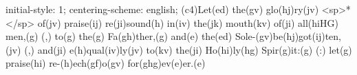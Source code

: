 initial-style: 1;
centering-scheme: english;
(c4)Let(ed) the(gv) glo(hj)ry(jv) <sp>*</sp> of(jv) praise(ij) re(ji)sound(h) in(iv) the(jk) mouth(kv) of(ji) all(hiHG) men,(g) (,) to(g) the(g) Fa(gh)ther,(g) and(e) the(ed) Sole-(gv)be(hj)got(ij)ten,(jv) (,) and(ji) e(h)qual(iv)ly(jv) to(kv) the(ji) Ho(hi)ly(hg) Spir(g)it:(g) (:) let(g) praise(hi) re-(h)ech(gf)o(gv) for(ghg)ev(e)er.(e)
